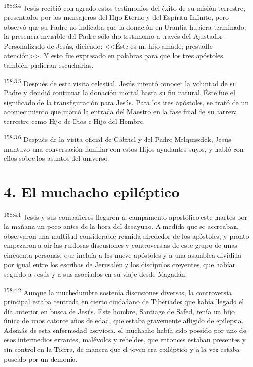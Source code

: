 \par 
\textsuperscript{158:3.4} Jesús recibió con agrado estos testimonios del éxito de su misión terrestre, presentados por los mensajeros del Hijo Eterno y del Espíritu Infinito, pero observó que su Padre no indicaba que la donación en Urantia hubiera terminado; la presencia invisible del Padre sólo dio testimonio a través del Ajustador Personalizado de Jesús, diciendo: <<Éste es mi hijo amado; prestadle atención>>. Y esto fue expresado en palabras para que los tres apóstoles también pudieran escucharlas.

\par 
\textsuperscript{158:3.5} Después de esta visita celestial, Jesús intentó conocer la voluntad de su Padre y decidió continuar la donación mortal hasta su fin natural. Éste fue el significado de la transfiguración para Jesús. Para los tres apóstoles, se trató de un acontecimiento que marcó la entrada del Maestro en la fase final de su carrera terrestre como Hijo de Dios e Hijo del Hombre.

\par 
\textsuperscript{158:3.6} Después de la visita oficial de Gabriel y del Padre Melquisedek, Jesús mantuvo una conversación familiar con estos Hijos ayudantes suyos, y habló con ellos sobre los asuntos del universo.

\section*{4. El muchacho epiléptico}
\par 
\textsuperscript{158:4.1} Jesús y sus compañeros llegaron al campamento apostólico este martes por la mañana un poco antes de la hora del desayuno. A medida que se acercaban, observaron una multitud considerable reunida alrededor de los apóstoles, y pronto empezaron a oír las ruidosas discusiones y controversias de este grupo de unas cincuenta personas, que incluía a los nueve apóstoles y a una asamblea dividida por igual entre los escribas de Jerusalén y los discípulos creyentes, que habían seguido a Jesús y a sus asociados en su viaje desde Magadán.

\par 
\textsuperscript{158:4.2} Aunque la muchedumbre sostenía discusiones diversas, la controversia principal estaba centrada en cierto ciudadano de Tiberiades que había llegado el día anterior en busca de Jesús. Este hombre, Santiago de Safed, tenía un hijo único de unos catorce años de edad, que estaba gravemente afligido de epilepsia. Además de esta enfermedad nerviosa, el muchacho había sido poseído por uno de esos intermedios errantes, malévolos y rebeldes, que entonces estaban presentes y sin control en la Tierra, de manera que el joven era epiléptico y a la vez estaba poseído por un demonio.

